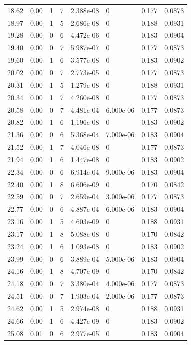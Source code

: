 \documentclass[preview]{standalone}
\begin{document}
{{{\begin{tabular}{L{1.2cm}C{1.2cm} C{0.3cm}C{0.5cm} C{1.4cm}C{1.4cm} C{1.4cm}C{1.4cm}}
  18.62  &  0.00  & 1     &  7 &  2.388e-08  & 0  & 0.177 &  0.0873   \\ 
  18.97  &  0.00  & 1     &  5 &  2.686e-08  & 0  & 0.188 &  0.0931   \\ 
  19.28  &  0.00  & 0     &  6 &  4.472e-06  & 0  & 0.183 &  0.0904   \\ 
  19.40  &  0.00  & 0     &  7 &  5.987e-07  & 0  & 0.177 &  0.0873   \\ 
  19.60  &  0.00  & 1     &  6 &  3.577e-08  & 0  & 0.183 &  0.0902   \\ 
  20.02  &  0.00  & 0     &  7 &  2.773e-05  & 0  & 0.177 &  0.0873   \\ 
  20.31  &  0.00  & 1     &  5 &  1.279e-08  & 0  & 0.188 &  0.0931   \\ 
  20.34  &  0.00  & 1     &  7 &  4.260e-08  & 0  & 0.177 &  0.0873   \\ 
  20.58  &  0.00  & 0     &  7 &  4.481e-04  & 6.000e-06  & 0.177 &  0.0873   \\ 
  20.82  &  0.00  & 1     &  6 &  1.196e-08  & 0  & 0.183 &  0.0902   \\ 
  21.36  &  0.00  & 0     &  6 &  5.368e-04  & 7.000e-06  & 0.183 &  0.0904   \\ 
  21.52  &  0.00  & 1     &  7 &  4.046e-08  & 0  & 0.177 &  0.0873   \\ 
  21.94  &  0.00  & 1     &  6 &  1.447e-08  & 0  & 0.183 &  0.0902   \\ 
  22.34  &  0.00  & 0     &  6 &  6.914e-04  & 9.000e-06  & 0.183 &  0.0904   \\ 
  22.40  &  0.00  & 1     &  8 &  6.606e-09  & 0  & 0.170 &  0.0842   \\ 
  22.59  &  0.00  & 0     &  7 &  2.659e-04  & 3.000e-06  & 0.177 &  0.0873   \\ 
  22.77  &  0.00  & 0     &  6 &  4.887e-04  & 6.000e-06  & 0.183 &  0.0904   \\ 
  23.16  &  0.00  & 1     &  5 &  4.603e-09  & 0  & 0.188 &  0.0931   \\ 
  23.17  &  0.00  & 1     &  8 &  5.088e-08  & 0  & 0.170 &  0.0842   \\ 
  23.24  &  0.00  & 1     &  6 &  1.093e-08  & 0  & 0.183 &  0.0902   \\ 
  23.99  &  0.00  & 0     &  6 &  3.889e-04  & 5.000e-06  & 0.183 &  0.0904   \\ 
  24.16  &  0.00  & 1     &  8 &  4.707e-09  & 0  & 0.170 &  0.0842   \\ 
  24.18  &  0.00  & 0     &  7 &  3.380e-04  & 4.000e-06  & 0.177 &  0.0873   \\ 
  24.51  &  0.00  & 0     &  7 &  1.903e-04  & 2.000e-06  & 0.177 &  0.0873   \\ 
  24.62  &  0.00  & 1     &  5 &  2.974e-08  & 0  & 0.188 &  0.0931   \\ 
  24.66  &  0.00  & 1     &  6 &  4.427e-09  & 0  & 0.183 &  0.0902   \\ 
  25.08  &  0.01  & 0     &  6 &  2.977e-05  & 0  & 0.183 &  0.0904   \\ 
\hline 
\end{tabular} 

}}}
\end{document}
